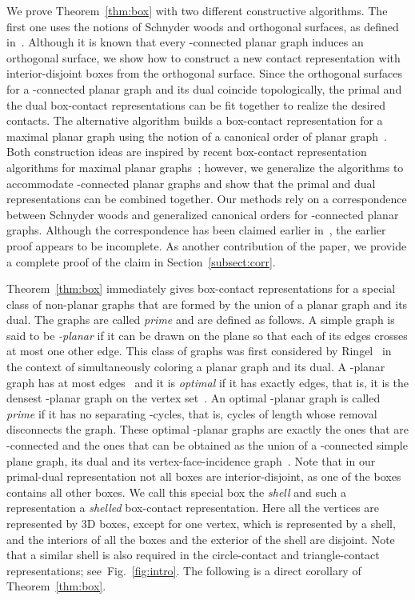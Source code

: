 \documentclass{article}
\newcommand{\df}{\textit}
\begin{document}
We prove Theorem~\ref{thm:box} with two different constructive algorithms. The first one
uses the notions of Schnyder woods and orthogonal surfaces, as defined in~\cite{FZ08}.
Although it is known that every -connected planar graph induces an orthogonal surface, we show how to
construct a new contact representation with interior-disjoint boxes from the orthogonal surface.
Since the orthogonal surfaces for a -connected planar graph and its dual coincide
topologically,
the primal and the dual box-contact representations can be fit together to realize the desired contacts.
The alternative algorithm
builds a box-contact representation for a maximal planar graph using the notion of a canonical order
 of planar graph~\cite{FPP90}. Both construction ideas are inspired by recent box-contact representation
 algorithms for maximal planar graphs~\cite{BEFHK+12}; however, we generalize the algorithms to
 accommodate -connected planar graphs and show that the primal and dual representations can
 be combined together.
Our methods rely on a correspondence between Schnyder woods and generalized canonical orders for
 -connected planar graphs. Although the correspondence has been claimed earlier in~\cite{BBC11},
 the earlier proof appears to be incomplete. As another contribution of the paper, we provide a complete
 proof of the claim in Section~\ref{subsect:corr}. 


Theorem~\ref{thm:box} immediately gives box-contact representations for a special class of
non-planar graphs that are formed by the union of a planar graph and its dual. The graphs are
called \df{prime} and are defined as follows. A simple graph  is said to be \df{-planar}
if it can be drawn on the plane so that each of its edges crosses at most one other edge.
This class of graphs was first considered by Ringel~\cite{Rin65} in the context of simultaneously coloring a planar graph and its dual. A -planar graph has at most  edges~\cite{FM07,PT97}
and it is \df{optimal} if it has exactly  edges, that is, it is the
densest -planar graph on the vertex set~\cite{BSW84,BEGGH+13}. An optimal
-planar graph is called \df{prime} if it has no
separating -cycles, that is, cycles of length  whose removal disconnects the graph. These optimal -planar
graphs are exactly the ones that are -connected and the ones that can be obtained as the union of a -connected
simple plane graph, its dual and its vertex-face-incidence graph~\cite{Sch86}.
Note that in our primal-dual representation not all boxes are interior-disjoint, as one of the boxes
contains all other boxes. We call this special box the \df{shell} and such a
representation a \df{shelled} box-contact representation. Here all the vertices are represented
by 3D boxes, except for one vertex, which is represented by a shell, and the interiors of all the
boxes and the exterior of the shell are disjoint. Note that a similar shell
is also required in the circle-contact and triangle-contact
representations; see~Fig.~\ref{fig:intro}. The following is a direct
corollary of Theorem~\ref{thm:box}.
\end{document}
